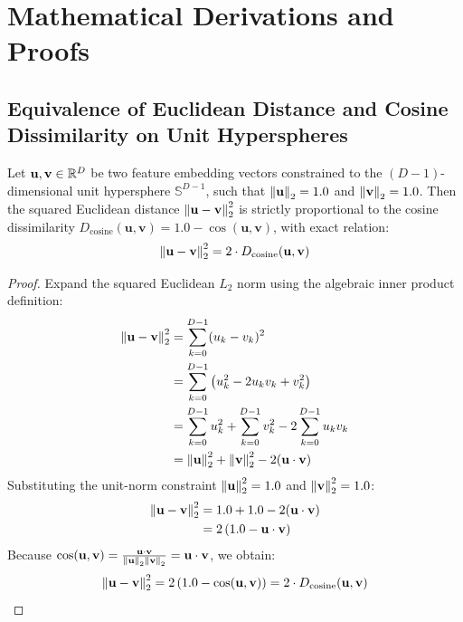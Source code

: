 \chapter{Mathematical Derivations and Proofs}
\label{app:derivations}

\section{Equivalence of Euclidean Distance and Cosine Dissimilarity on Unit Hyperspheres}
\label{sec:proof_cosine_euclidean}

\begin{theorem}
Let $\mathbf{u}, \mathbf{v} \in \mathbb{R}^D$ be two feature embedding vectors constrained to the $(D-1)$-dimensional unit hypersphere $\mathbb{S}^{D-1}$, such that $\left\lVert\mathbf{u}\right\rVert_2 = 1.0$ and $\left\lVert\mathbf{v}\right\rVert_2 = 1.0$. Then the squared Euclidean distance $\left\lVert\mathbf{u} - \mathbf{v}\right\rVert_2^2$ is strictly proportional to the cosine dissimilarity $D_{\text{cosine}}(\mathbf{u}, \mathbf{v}) = 1.0 - \cos(\mathbf{u}, \mathbf{v})$, with exact relation:
\begin{equation}
    \left\lVert\mathbf{u} - \mathbf{v}\right\rVert_2^2 = 2 \cdot D_{\text{cosine}}(\mathbf{u}, \mathbf{v})
    \label{eq:proof_euclidean_cosine}
\end{equation}
\end{theorem}

\begin{proof}
Expand the squared Euclidean $L_2$ norm using the algebraic inner product definition:
\begin{align}
    \left\lVert\mathbf{u} - \mathbf{v}\right\rVert_2^2 &= \sum_{k=0}^{D-1} (u_k - v_k)^2 \\
    &= \sum_{k=0}^{D-1} \left( u_k^2 - 2 u_k v_k + v_k^2 \right) \\
    &= \sum_{k=0}^{D-1} u_k^2 + \sum_{k=0}^{D-1} v_k^2 - 2 \sum_{k=0}^{D-1} u_k v_k \\
    &= \left\lVert\mathbf{u}\right\rVert_2^2 + \left\lVert\mathbf{v}\right\rVert_2^2 - 2 (\mathbf{u} \cdot \mathbf{v})
\end{align}
Substituting the unit-norm constraint $\left\lVert\mathbf{u}\right\rVert_2^2 = 1.0$ and $\left\lVert\mathbf{v}\right\rVert_2^2 = 1.0$:
\begin{align}
    \left\lVert\mathbf{u} - \mathbf{v}\right\rVert_2^2 &= 1.0 + 1.0 - 2 (\mathbf{u} \cdot \mathbf{v}) \\
    &= 2 \left( 1.0 - \mathbf{u} \cdot \mathbf{v} \right)
\end{align}
Because $\cos(\mathbf{u}, \mathbf{v}) = \frac{\mathbf{u} \cdot \mathbf{v}}{\left\lVert\mathbf{u}\right\rVert_2 \left\lVert\mathbf{v}\right\rVert_2} = \mathbf{u} \cdot \mathbf{v}$, we obtain:
\begin{equation}
    \left\lVert\mathbf{u} - \mathbf{v}\right\rVert_2^2 = 2 \left( 1.0 - \cos(\mathbf{u}, \mathbf{v}) \right) = 2 \cdot D_{\text{cosine}}(\mathbf{u}, \mathbf{v})
\end{equation}
\end{proof}

